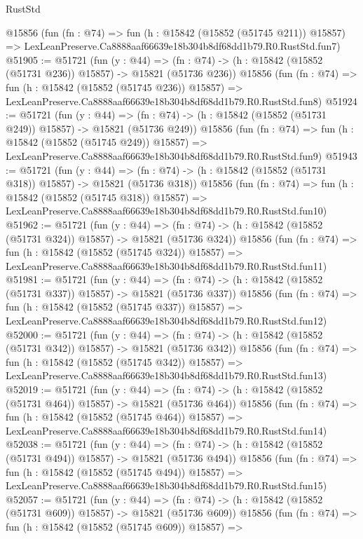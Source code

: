 \begin{lexlean}{RustStd}
\begin{coremodule}
    @15856
    (fun (fn : @74) =>
    fun (h : @15842 (@15852 (@51745 @211)) @15857) =>
    LexLeanPreserve.Ca8888aaf66639e18b304b8df68dd1b79.R0.RustStd.fun7)
@51905 := @51721
    (fun (y : @44) =>
    (fn : @74) -> (h : @15842 (@15852 (@51731 @236)) @15857) -> @15821 (@51736 @236))
    @15856
    (fun (fn : @74) =>
    fun (h : @15842 (@15852 (@51745 @236)) @15857) =>
    LexLeanPreserve.Ca8888aaf66639e18b304b8df68dd1b79.R0.RustStd.fun8)
@51924 := @51721
    (fun (y : @44) =>
    (fn : @74) -> (h : @15842 (@15852 (@51731 @249)) @15857) -> @15821 (@51736 @249))
    @15856
    (fun (fn : @74) =>
    fun (h : @15842 (@15852 (@51745 @249)) @15857) =>
    LexLeanPreserve.Ca8888aaf66639e18b304b8df68dd1b79.R0.RustStd.fun9)
@51943 := @51721
    (fun (y : @44) =>
    (fn : @74) -> (h : @15842 (@15852 (@51731 @318)) @15857) -> @15821 (@51736 @318))
    @15856
    (fun (fn : @74) =>
    fun (h : @15842 (@15852 (@51745 @318)) @15857) =>
    LexLeanPreserve.Ca8888aaf66639e18b304b8df68dd1b79.R0.RustStd.fun10)
@51962 := @51721
    (fun (y : @44) =>
    (fn : @74) -> (h : @15842 (@15852 (@51731 @324)) @15857) -> @15821 (@51736 @324))
    @15856
    (fun (fn : @74) =>
    fun (h : @15842 (@15852 (@51745 @324)) @15857) =>
    LexLeanPreserve.Ca8888aaf66639e18b304b8df68dd1b79.R0.RustStd.fun11)
@51981 := @51721
    (fun (y : @44) =>
    (fn : @74) -> (h : @15842 (@15852 (@51731 @337)) @15857) -> @15821 (@51736 @337))
    @15856
    (fun (fn : @74) =>
    fun (h : @15842 (@15852 (@51745 @337)) @15857) =>
    LexLeanPreserve.Ca8888aaf66639e18b304b8df68dd1b79.R0.RustStd.fun12)
@52000 := @51721
    (fun (y : @44) =>
    (fn : @74) -> (h : @15842 (@15852 (@51731 @342)) @15857) -> @15821 (@51736 @342))
    @15856
    (fun (fn : @74) =>
    fun (h : @15842 (@15852 (@51745 @342)) @15857) =>
    LexLeanPreserve.Ca8888aaf66639e18b304b8df68dd1b79.R0.RustStd.fun13)
@52019 := @51721
    (fun (y : @44) =>
    (fn : @74) -> (h : @15842 (@15852 (@51731 @464)) @15857) -> @15821 (@51736 @464))
    @15856
    (fun (fn : @74) =>
    fun (h : @15842 (@15852 (@51745 @464)) @15857) =>
    LexLeanPreserve.Ca8888aaf66639e18b304b8df68dd1b79.R0.RustStd.fun14)
@52038 := @51721
    (fun (y : @44) =>
    (fn : @74) -> (h : @15842 (@15852 (@51731 @494)) @15857) -> @15821 (@51736 @494))
    @15856
    (fun (fn : @74) =>
    fun (h : @15842 (@15852 (@51745 @494)) @15857) =>
    LexLeanPreserve.Ca8888aaf66639e18b304b8df68dd1b79.R0.RustStd.fun15)
@52057 := @51721
    (fun (y : @44) =>
    (fn : @74) -> (h : @15842 (@15852 (@51731 @609)) @15857) -> @15821 (@51736 @609))
    @15856
    (fun (fn : @74) =>
    fun (h : @15842 (@15852 (@51745 @609)) @15857) =>

\end{coremodule}
\end{lexlean}
